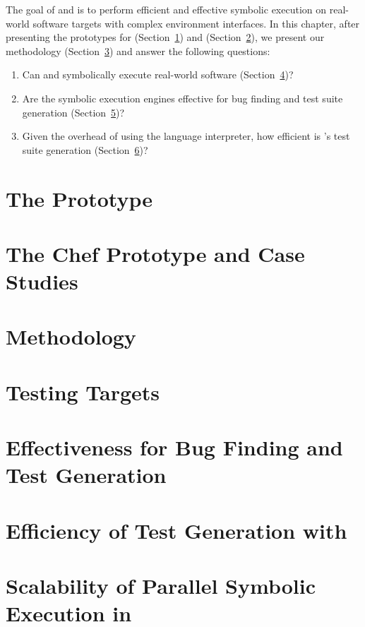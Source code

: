 The goal of \chef and \cnine is to perform efficient and effective symbolic execution on real-world software targets with complex environment interfaces.
%
In this chapter, after presenting the prototypes for \cnine (Section~\ref{sec:eval:cnine-proto}) and \chef (Section~\ref{sec:eval:chef-proto}), we present our methodology (Section~\ref{sec:eval:methodology}) and answer the following questions:
\begin{enumerate}
\item Can \chef and \cnine symbolically execute real-world software (Section~\ref{sec:eval:targets})?
\item Are the symbolic execution engines effective for bug finding and test suite generation (Section~\ref{sec:eval:bug-finding})?
\item Given the overhead of using the language interpreter, how efficient is \chef's test suite generation (Section~\ref{sec:eval:chef-efficiency})?
\end{enumerate}

\section{The \cnine Prototype}
\label{sec:eval:cnine-proto}


\section{The Chef Prototype and Case Studies}
\label{sec:eval:chef-proto}


\section{Methodology}
\label{sec:eval:methodology}


\section{Testing Targets}
\label{sec:eval:targets}


\section{Effectiveness for Bug Finding and Test Generation}
\label{sec:eval:bug-finding}


\section{Efficiency of Test Generation with \chef}
\label{sec:eval:chef-efficiency}


\section{Scalability of Parallel Symbolic Execution in \cnine}
\label{sec:eval:cnine-efficiency}


